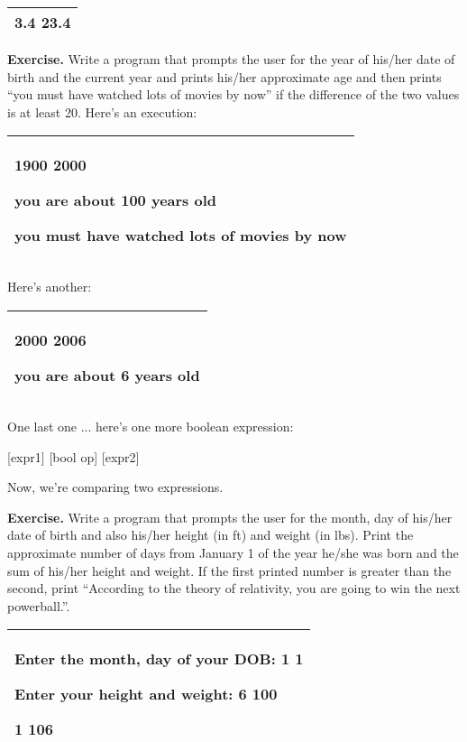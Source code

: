\documentclass[
]{article}
\begin{document}
\begin{longtable}[]{@{}l@{}}
\toprule
\endhead
3.4 23.4\tabularnewline
\bottomrule
\end{longtable}

\textbf{Exercise.} Write a program that prompts the user for the year of
his/her date of birth and the current year and prints his/her
approximate age and then prints ``you must have watched lots of movies
by now'' if the difference of the two values is at least 20. Here's an
execution:

\begin{longtable}[]{@{}l@{}}
\toprule
\endhead
\begin{minipage}[t]{0.97\columnwidth}\raggedright
1900 2000

you are about 100 years old

you must have watched lots of movies by now\strut
\end{minipage}\tabularnewline
\bottomrule
\end{longtable}

Here's another:

\begin{longtable}[]{@{}l@{}}
\toprule
\endhead
\begin{minipage}[t]{0.97\columnwidth}\raggedright
2000 2006

you are about 6 years old\strut
\end{minipage}\tabularnewline
\bottomrule
\end{longtable}

One last one ... here's one more boolean expression:

{[}expr1{]} {[}bool op{]} {[}expr2{]}

Now, we're comparing two expressions.

\textbf{Exercise.} Write a program that prompts the user for the month,
day of his/her date of birth and also his/her height (in ft) and weight
(in lbs). Print the approximate number of days from January 1 of the
year he/she was born and the sum of his/her height and weight. If the
first printed number is greater than the second, print ``According to
the theory of relativity, you are going to win the next powerball.''.

\begin{longtable}[]{@{}l@{}}
\toprule
\endhead
\begin{minipage}[t]{0.97\columnwidth}\raggedright
Enter the month, day of your DOB: \textbf{1 1}

Enter your height and weight: \textbf{6 100}

1 106\strut
\end{minipage}\tabularnewline
\bottomrule
\end{longtable}
\end{document}
